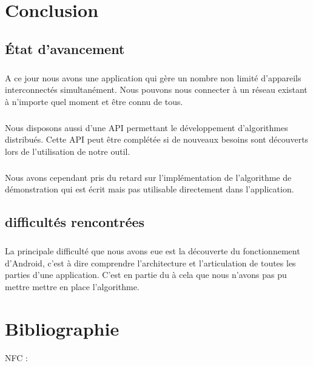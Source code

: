 \documentclass[a4paper,10pt]{report}
\begin{document}
\chapter{Conclusion}
\section{État d'avancement}
\paragraph{}
A ce jour nous avons une application qui gère un nombre non limité d'appareils interconnectés simultanément. Nous pouvons nous connecter à un réseau existant à n'importe quel moment et être connu de tous.
\paragraph{}
Nous disposons aussi d'une API permettant le développement d'algorithmes distribués. Cette API peut être complétée si de nouveaux besoins sont découverts lors de l'utilisation de notre outil.
\paragraph{}
Nous avons cependant pris du retard sur l'implémentation de l'algorithme de démonstration qui est écrit mais pas utilisable directement dans l'application.
\paragraph{}
\section{difficultés rencontrées}
\paragraph{}
La principale difficulté que nous avons eue est la découverte du fonctionnement d'Android, c'est à dire comprendre l'architecture et l'articulation de toutes les parties d'une application. C'est en partie du à cela que nous n'avons pas pu mettre mettre en place l'algorithme.
\newpage
\listoffigures  %
\chapter*{Bibliographie}
\sloppy
 NFC :
 
\end{document}
